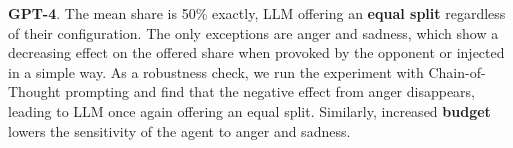 \documentclass{article}
\begin{document}

\textbf{GPT-4}. The mean share is 50\% exactly, LLM offering an \textbf{equal split} regardless of their configuration. The only exceptions are anger and sadness, which show a decreasing effect on the offered share when provoked by the opponent or injected in a simple way. As a robustness check, we run the experiment with Chain-of-Thought prompting and find that the negative effect from anger disappears, leading to LLM once again offering an equal split. Similarly, increased \textbf{budget} lowers the sensitivity of the agent to anger and sadness. 
\end{document}
